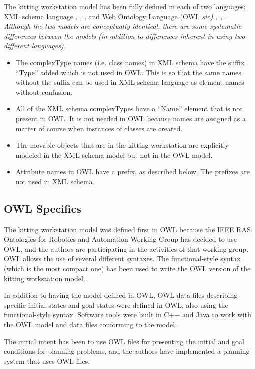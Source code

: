 The kitting workstation model has been fully defined in each of two
languages: XML schema language \cite{Walmsley.2002},
\cite{XMLschemaPrimer}, \cite{XMLschemaStructures}, and Web Ontology
Language (OWL \it sic\rm) \cite{OWLoverview}, \cite{OWLprimer},
\cite{OWLspec}. Although the two models are conceptually identical, there
are some systematic differences between the models (in addition to
differences inherent in using two different languages).

\begin{itemize}
\item The complexType names (i.e. class names) in XML schema have the
  suffix ``Type'' added which is not used in OWL. This is so that the same
  names without the suffix can be used in XML schema language as element
  names without confusion.

\item All of the XML schema complexTypes have a ``Name'' element that is
  not present in OWL. It is not needed in OWL because names are assigned as
  a matter of course when instances of classes are created.

\item The movable objects that are in the kitting workstation are
  explicitly modeled in the XML schema model but not in the OWL model.

\item Attribute names in OWL have a prefix, as described below. The
  prefixes are not used in XML schema.
\end{itemize}

\subsection{OWL Specifics}
The kitting workstation model was defined first in OWL because the IEEE RAS
Ontologies for Robotics and Automation Working Group has decided to use
OWL, and the authors are participating in the activities of that working
group. OWL allows the use of several different syntaxes. The
functional-style syntax (which is the most compact one) has been used to
write the OWL version of the kitting workstation model.

In addition to having the model defined in OWL, OWL data files describing
specific initial states and goal states were defined in OWL, also using the
functional-style syntax.  Software tools were built in C++ and Java to work with the
OWL model and data files conforming to the model.

The initial intent has been to use OWL files for presenting the initial and
goal conditions for planning problems, and the authors have implemented a
planning system that uses OWL files.

